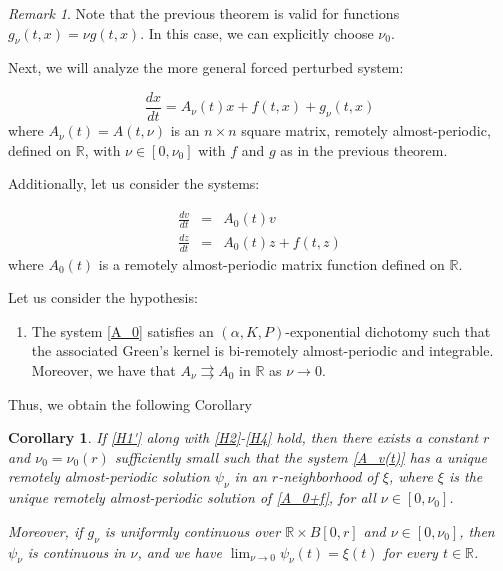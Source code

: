 \documentclass[english,reqno]{amsart}
\numberwithin{equation}{section}
\theoremstyle{plain}
\newtheorem{cor}[thm]{Corollary}
\theoremstyle{definition}
\theoremstyle{remark}
\newtheorem*{rem}{Remark}
\begin{document}
\begin{rem}
Note that the previous theorem is valid for functions $g_\nu(t,x)=\nu g(t,x)$. In this case, we can explicitly choose $\nu_0$.
\end{rem}

Next, we will analyze the more general forced perturbed system:

\begin{equation}
\frac{dx}{dt}=A_{\nu}\left(t\right)x+f\left(t,x\right)+g_{\nu}\left(t,x\right)\label{A_v(t)}
\end{equation}
where $A_{\nu}\left(t\right)=A(t,\nu)$ is an $n \times n$ square matrix, remotely almost-periodic, defined on $\mathbb{R}$, with $\nu\in\left[0,\nu_{0}\right]$ with $f$ and $g$ as in the previous theorem.


Additionally, let us consider the systems:

\begin{eqnarray}
\frac{dv}{dt}&=&A_{0}\left(t\right)v\label{A_0}\\
\frac{dz}{dt}&=&A_{0}\left(t\right)z+f\left(t,z\right)\label{A_0+f}
\end{eqnarray}
where $A_{0}\left(t\right)$ is a remotely almost-periodic matrix function defined on $\mathbb{R}$. 

Let us consider the hypothesis:

\begin{enumerate}[label=(\textbf{{H.\arabic*}'})]
\item \label{H1'} The system \eqref{A_0} satisfies an $(\alpha,K,P)$-exponential dichotomy such that the associated Green's kernel is bi-remotely almost-periodic and integrable. Moreover, we have that $A_{\nu} \rightrightarrows A_{0}$ in $\mathbb{R}$ as $\nu\rightarrow0$.
\end{enumerate}

Thus, we obtain the following Corollary
\begin{cor}\label{corolario_aplicar_average}
If \ref{H1'} along with \ref{H2}-\ref{H4} 
hold, then there exists a constant $r$ and $\nu_{0}=\nu_{0}\left(r\right)$ sufficiently small such that the system \eqref{A_v(t)} has a unique remotely almost-periodic solution $\psi_{\nu}$ in an $r$-neighborhood of $\xi$, where $\xi$ is the unique remotely almost-periodic solution of \eqref{A_0+f}, for all $\nu\in\left[0,\nu_{0}\right]$.  

Moreover, if $g_{\nu}$ is uniformly continuous over $\mathbb{R}\times B\left[0,r\right]$ and $\nu\in\left[0,\nu_{0}\right]$, then $\psi_{\nu}$ is continuous in $\nu$, and we have  $\lim_{\nu\rightarrow0}\psi_{\nu}\left(t\right)=\xi(t)$ for every $t\in\mathbb{R}$.
\end{cor}
\end{document}
